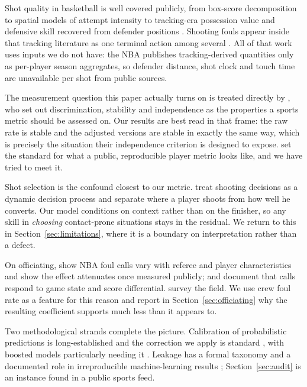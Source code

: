 \documentclass[11pt,a4paper]{article}
\begin{document}
Shot quality in basketball is well covered publicly, from box-score
decomposition \citep{kubatko2007starting} to spatial models of attempt intensity
\citep{miller2014factorized} to tracking-era possession value
\citep{cervone2016multiresolution} and defensive skill recovered from defender
positions \citep{franks2015characterizing}. Shooting fouls appear inside that
tracking literature as one terminal action among several
\citep{sicilia2019deephoops}. All of that work uses inputs we do not have: the
NBA publishes tracking-derived quantities only as per-player season aggregates,
so defender distance, shot clock and touch time are unavailable per shot from
public sources.

The measurement question this paper actually turns on is treated directly by
\citet{franks2016meta}, who set out discrimination, stability and independence as
the properties a sports metric should be assessed on. Our results are best read
in that frame: the raw rate is stable and the adjusted versions are stable in
exactly the same way, which is precisely the situation their independence
criterion is designed to expose. \citet{baumer2015openwar} set the standard for
what a public, reproducible player metric looks like, and we have tried to meet
it.

Shot selection is the confound closest to our metric. \citet{sandholtz2020markov}
treat shooting decisions as a dynamic decision process and
\citet{sandholtz2020measuring} separate where a player shoots from how well he
converts. Our model conditions on context rather than on the finisher, so any
skill in \emph{choosing} contact-prone situations stays in the residual. We
return to this in Section~\ref{sec:limitations}, where it is a boundary on
interpretation rather than a defect.

On officiating, \citet{price2010racial} show NBA foul calls vary with referee and
player characteristics and \citet{pope2018awareness} show the effect attenuates
once measured publicly; \citet{anderson2009officiating} and
\citet{price2012subperfect} document that calls respond to game state and score
differential. \citet{dohmen2016referee} survey the field. We use crew foul rate
as a feature for this reason and report in Section~\ref{sec:officiating} why the
resulting coefficient supports much less than it appears to.

Two methodological strands complete the picture. Calibration of probabilistic
predictions is long-established \citep{brier1950verification} and the correction
we apply is standard \citep{zadrozny2002transforming}, with boosted models
particularly needing it \citep{niculescu2005predicting, guo2017calibration}.
Leakage has a formal taxonomy \citep{kaufman2012leakage} and a documented role in
irreproducible machine-learning results \citep{kapoor2023leakage};
Section~\ref{sec:audit} is an instance found in a public sports feed.
\end{document}
